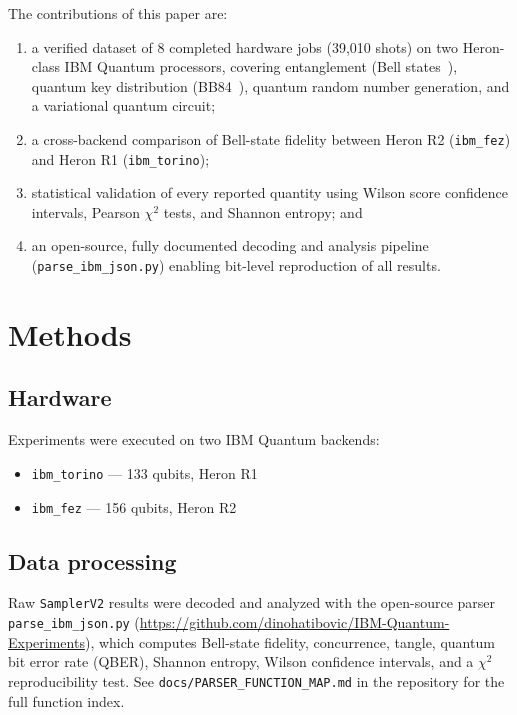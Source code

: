 \documentclass[11pt]{article}
\begin{document}
The contributions of this paper are:
\begin{enumerate}
  \item a verified dataset of 8 completed hardware jobs (39{,}010 shots) on
    two Heron-class IBM Quantum processors, covering entanglement
    (Bell states~\cite{nielsen2010quantum}), quantum key distribution
    (BB84~\cite{bennett1984quantum}), quantum random number generation, and
    a variational quantum circuit;
  \item a cross-backend comparison of Bell-state fidelity between Heron R2
    (\texttt{ibm\_fez}) and Heron R1 (\texttt{ibm\_torino});
  \item statistical validation of every reported quantity using Wilson score
    confidence intervals, Pearson $\chi^2$ tests, and Shannon entropy; and
  \item an open-source, fully documented decoding and analysis pipeline
    (\texttt{parse\_ibm\_json.py}) enabling bit-level reproduction of all
    results.
\end{enumerate}

\section{Methods}

\subsection{Hardware}
Experiments were executed on two IBM Quantum backends:
\begin{itemize}
  \item \texttt{ibm\_torino} --- 133 qubits, Heron R1
  \item \texttt{ibm\_fez} --- 156 qubits, Heron R2
\end{itemize}

\subsection{Data processing}
Raw \texttt{SamplerV2} results were decoded and analyzed with the
open-source parser \texttt{parse\_ibm\_json.py}
(\url{https://github.com/dinohatibovic/IBM-Quantum-Experiments}), which
computes Bell-state fidelity, concurrence, tangle, quantum bit error rate
(QBER), Shannon entropy, Wilson confidence intervals, and a
$\chi^2$ reproducibility test. See \texttt{docs/PARSER\_FUNCTION\_MAP.md} in
the repository for the full function index.
\end{document}

